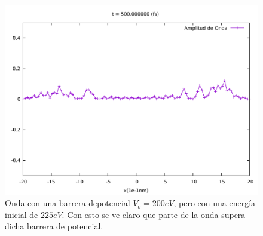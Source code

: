 \begin{figure}[H]
	\centering
	\includegraphics[scale=0.5]{../img/ej7-22.pdf}
	\caption{Onda con una barrera depotencial $V_o = 200eV$, pero con una energía inicial de $225eV$. Con esto se ve claro que parte de la onda supera dicha barrera de potencial.}
	\label{ej7-22}
\end{figure}


